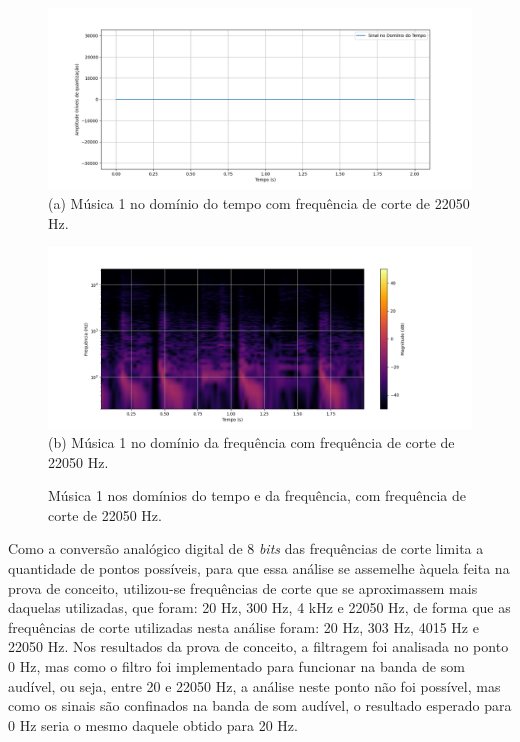 \begin{figure}[htpb]
    \centering
    \begin{minipage}[b]{0.7\textwidth}
        \centering
        \includegraphics[width=\textwidth]{figuras/fig87.png}
        \vspace{0.3cm} %
        (a) Música 1 no domínio do tempo com frequência de corte de 22050 Hz.
    \end{minipage}
    \hspace{0.5cm} %

    \begin{minipage}[b]{0.7\textwidth}
        \centering
        \includegraphics[width=\textwidth]{figuras/fig88.png}
        \vspace{0.3cm} %
        (b) Música 1 no domínio da frequência com frequência de corte de 22050 Hz.
    \end{minipage}

    \caption{Música 1 nos domínios do tempo e da frequência, com frequência de corte de 22050 Hz.}
    \label{fig87}
\end{figure}


Como a conversão analógico digital de 8 \textit{bits} das frequências de corte limita a quantidade de pontos possíveis, para que essa análise se assemelhe àquela feita na prova de conceito, utilizou-se frequências de corte que se aproximassem mais daquelas utilizadas, que foram: 20 Hz, 300 Hz, 4 kHz e 22050 Hz, de forma que as frequências de corte utilizadas nesta análise foram: 20 Hz, 303 Hz, 4015 Hz e 22050 Hz. Nos resultados da prova de conceito, a filtragem foi analisada no ponto 0 Hz, mas como o filtro foi implementado para funcionar na banda de som audível, ou seja, entre 20 e 22050 Hz, a análise neste ponto não foi possível, mas como os sinais são confinados na banda de som audível, o resultado esperado para 0 Hz seria o mesmo daquele obtido para 20 Hz. 


